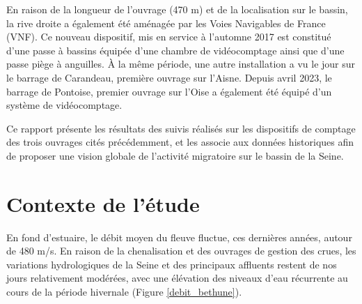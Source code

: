 \documentclass[11pt,twoside]{article}\usepackage[]{graphicx}\usepackage[table]{xcolor}
\begin{document}
En raison de la longueur de l'ouvrage (470 m) et de la localisation sur le bassin, la rive droite a également été aménagée par les Voies Navigables de France (VNF). Ce nouveau dispositif, mis en service à l'automne 2017 est constitué d'une passe à bassins équipée d'une chambre de vidéocomptage ainsi que d'une passe piège à anguilles. À la même période, une autre installation a vu le jour sur le barrage de Carandeau, première ouvrage sur l'Aisne. Depuis avril 2023, le barrage de Pontoise, premier ouvrage sur l'Oise a également été équipé d'un système de vidéocomptage.

Ce rapport présente les résultats des suivis réalisés sur les dispositifs de comptage des trois ouvrages cités précédemment, et les associe aux données historiques afin de proposer une vision globale de l'activité migratoire sur le bassin de la Seine.

\clearpage

\section{Contexte de l'étude}

% 
% 
% 
En fond d'estuaire, le débit moyen du fleuve fluctue, ces dernières années, autour de 480 m/s. En raison de la chenalisation et des ouvrages de gestion des crues, les variations hydrologiques de la Seine et des principaux affluents restent de nos jours relativement modérées, avec une élévation des niveaux d'eau récurrente au cours de la période hivernale
(Figure \ref{debit_bethune}).
\end{document}
